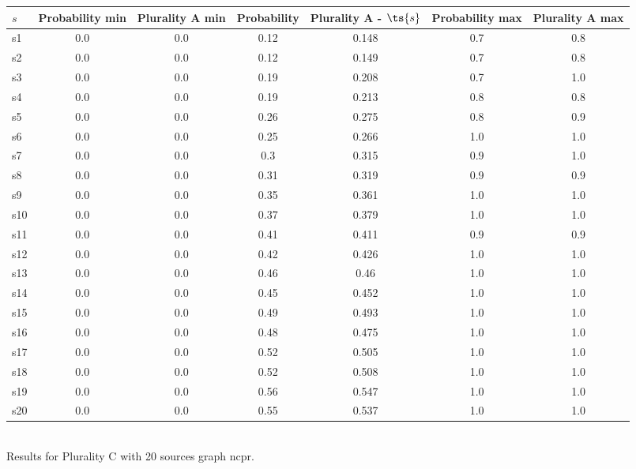 \documentclass{article}
\begin{document}
\noindent\begin{tabular}{|l|c|c|c|c|c|c|}
\hline
$s$& Probability min & Plurality A min & Probability & Plurality A - $\ts{s}$ & Probability max & Plurality A max\\
\hline
s1 &0.0 & 0.0 & 0.12 & 0.148 & 0.7 & 0.8\\
\hline
s2 &0.0 & 0.0 & 0.12 & 0.149 & 0.7 & 0.8\\
\hline
s3 &0.0 & 0.0 & 0.19 & 0.208 & 0.7 & 1.0\\
\hline
s4 &0.0 & 0.0 & 0.19 & 0.213 & 0.8 & 0.8\\
\hline
s5 &0.0 & 0.0 & 0.26 & 0.275 & 0.8 & 0.9\\
\hline
s6 &0.0 & 0.0 & 0.25 & 0.266 & 1.0 & 1.0\\
\hline
s7 &0.0 & 0.0 & 0.3 & 0.315 & 0.9 & 1.0\\
\hline
s8 &0.0 & 0.0 & 0.31 & 0.319 & 0.9 & 0.9\\
\hline
s9 &0.0 & 0.0 & 0.35 & 0.361 & 1.0 & 1.0\\
\hline
s10 &0.0 & 0.0 & 0.37 & 0.379 & 1.0 & 1.0\\
\hline
s11 &0.0 & 0.0 & 0.41 & 0.411 & 0.9 & 0.9\\
\hline
s12 &0.0 & 0.0 & 0.42 & 0.426 & 1.0 & 1.0\\
\hline
s13 &0.0 & 0.0 & 0.46 & 0.46 & 1.0 & 1.0\\
\hline
s14 &0.0 & 0.0 & 0.45 & 0.452 & 1.0 & 1.0\\
\hline
s15 &0.0 & 0.0 & 0.49 & 0.493 & 1.0 & 1.0\\
\hline
s16 &0.0 & 0.0 & 0.48 & 0.475 & 1.0 & 1.0\\
\hline
s17 &0.0 & 0.0 & 0.52 & 0.505 & 1.0 & 1.0\\
\hline
s18 &0.0 & 0.0 & 0.52 & 0.508 & 1.0 & 1.0\\
\hline
s19 &0.0 & 0.0 & 0.56 & 0.547 & 1.0 & 1.0\\
\hline
s20 &0.0 & 0.0 & 0.55 & 0.537 & 1.0 & 1.0\\
\hline
\end{tabular}\\

\noindent Results for Plurality C with 20 sources graph ncpr.
\end{document}
